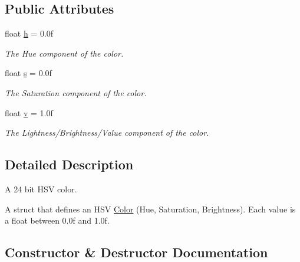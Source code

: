 \subsection*{Public Attributes}
\begin{DoxyCompactItemize}
\item 
\mbox{\label{struct_h_s_v_color_a015d43b1226532d7748e4c0b77d8f5fa}} 
float \hyperlink{struct_h_s_v_color_a015d43b1226532d7748e4c0b77d8f5fa}{h} = 0.\+0f
\begin{DoxyCompactList}\small\item\em The Hue component of the color. \end{DoxyCompactList}\item 
\mbox{\label{struct_h_s_v_color_a2935d350bd1966b6988a09a8867de625}} 
float \hyperlink{struct_h_s_v_color_a2935d350bd1966b6988a09a8867de625}{s} = 0.\+0f
\begin{DoxyCompactList}\small\item\em The Saturation component of the color. \end{DoxyCompactList}\item 
\mbox{\label{struct_h_s_v_color_a03308eb73b5b24d31a994ae8f80768ee}} 
float \hyperlink{struct_h_s_v_color_a03308eb73b5b24d31a994ae8f80768ee}{v} = 1.\+0f
\begin{DoxyCompactList}\small\item\em The Lightness/\+Brightness/\+Value component of the color. \end{DoxyCompactList}\end{DoxyCompactItemize}


\subsection{Detailed Description}
A 24 bit H\+SV color. 

A struct that defines an H\+SV \hyperlink{struct_color}{Color} (Hue, Saturation, Brightness). Each value is a float between 0.\+0f and 1.\+0f. 

\subsection{Constructor \& Destructor Documentation}
\mbox{\label{struct_h_s_v_color_a774e6af3f0c2fcf755c1cddaeac1c0d8}} 
